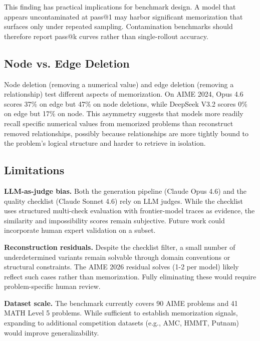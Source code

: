 \documentclass{article} %
\begin{document}
This finding has practical implications for benchmark design. A model that appears uncontaminated at pass@1 may harbor significant memorization that surfaces only under repeated sampling. Contamination benchmarks should therefore report pass@k curves rather than single-rollout accuracy.


\subsection{Node vs. Edge Deletion}
\label{sec:node_vs_edge}

Node deletion (removing a numerical value) and edge deletion (removing a relationship) test different aspects of memorization. On AIME 2024, Opus 4.6 scores 37\% on edge but 47\% on node deletions, while DeepSeek V3.2 scores 0\% on edge but 17\% on node. This asymmetry suggests that models more readily recall specific numerical values from memorized problems than reconstruct removed relationships, possibly because relationships are more tightly bound to the problem's logical structure and harder to retrieve in isolation.


\subsection{Limitations}
\label{sec:limitations}

\textbf{LLM-as-judge bias.} Both the generation pipeline (Claude Opus 4.6) and the quality checklist (Claude Sonnet 4.6) rely on LLM judges. While the checklist uses structured multi-check evaluation with frontier-model traces as evidence, the similarity and impossibility scores remain subjective. Future work could incorporate human expert validation on a subset.

\textbf{Reconstruction residuals.} Despite the checklist filter, a small number of underdetermined variants remain solvable through domain conventions or structural constraints. The AIME 2026 residual solves (1-2 per model) likely reflect such cases rather than memorization. Fully eliminating these would require problem-specific human review.

\textbf{Dataset scale.} The benchmark currently covers 90 AIME problems and 41 MATH Level 5 problems. While sufficient to establish memorization signals, expanding to additional competition datasets (e.g., AMC, HMMT, Putnam) would improve generalizability.
\end{document}
